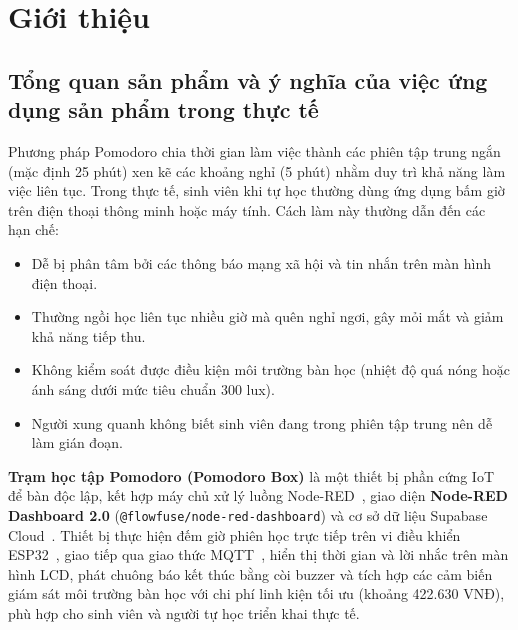 \section{Giới thiệu}

\subsection{Tổng quan sản phẩm và ý nghĩa của việc ứng dụng sản phẩm trong thực tế}

Phương pháp Pomodoro chia thời gian làm việc thành các phiên tập trung ngắn (mặc định 25 phút) xen kẽ các khoảng nghỉ (5 phút) nhằm duy trì khả năng làm việc liên tục. Trong thực tế, sinh viên khi tự học thường dùng ứng dụng bấm giờ trên điện thoại thông minh hoặc máy tính. Cách làm này thường dẫn đến các hạn chế:
\begin{itemize}[leftmargin=1.2cm, noitemsep, topsep=2pt]
    \item Dễ bị phân tâm bởi các thông báo mạng xã hội và tin nhắn trên màn hình điện thoại.
    \item Thường ngồi học liên tục nhiều giờ mà quên nghỉ ngơi, gây mỏi mắt và giảm khả năng tiếp thu.
    \item Không kiểm soát được điều kiện môi trường bàn học (nhiệt độ quá nóng hoặc ánh sáng dưới mức tiêu chuẩn 300 lux).
    \item Người xung quanh không biết sinh viên đang trong phiên tập trung nên dễ làm gián đoạn.
\end{itemize}

\textbf{Trạm học tập Pomodoro (Pomodoro Box)} là một thiết bị phần cứng IoT để bàn độc lập, kết hợp máy chủ xử lý luồng Node-RED~\cite{nodered2024}, giao diện \textbf{Node-RED Dashboard 2.0} (\texttt{@flowfuse/node-red-dashboard}) và cơ sở dữ liệu Supabase Cloud~\cite{supabase2024}. Thiết bị thực hiện đếm giờ phiên học trực tiếp trên vi điều khiển ESP32~\cite{espressif2023}, giao tiếp qua giao thức MQTT~\cite{mqttspec}, hiển thị thời gian và lời nhắc trên màn hình LCD, phát chuông báo kết thúc bằng còi buzzer và tích hợp các cảm biến giám sát môi trường bàn học với chi phí linh kiện tối ưu (khoảng 422.630 VNĐ), phù hợp cho sinh viên và người tự học triển khai thực tế.

